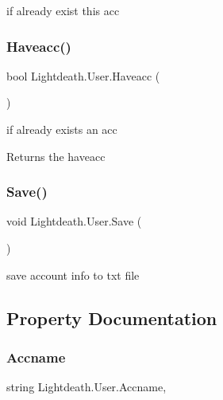 if already exist this acc 

\hypertarget{class_lightdeath_1_1_user_a1352aa65bececdd6929a5756ef2201a5}{}\label{class_lightdeath_1_1_user_a1352aa65bececdd6929a5756ef2201a5} 
\subsubsection{\texorpdfstring{Haveacc()}{Haveacc()}}
{\footnotesize\ttfamily bool Lightdeath.\+User.\+Haveacc (\begin{DoxyParamCaption}{ }\end{DoxyParamCaption})\hspace{0.3cm}{\ttfamily [inline]}}



if already exists an acc 

\begin{DoxyReturn}{Returns}
the haveacc
\end{DoxyReturn}
\hypertarget{class_lightdeath_1_1_user_a2bd89104f7fb1580a09f4a12defc1dea}{}\label{class_lightdeath_1_1_user_a2bd89104f7fb1580a09f4a12defc1dea} 
\subsubsection{\texorpdfstring{Save()}{Save()}}
{\footnotesize\ttfamily void Lightdeath.\+User.\+Save (\begin{DoxyParamCaption}{ }\end{DoxyParamCaption})\hspace{0.3cm}{\ttfamily [inline]}}



save account info to txt file 



\subsection{Property Documentation}
\hypertarget{class_lightdeath_1_1_user_a764e13d8c7bcb74e3373aaddfcc3578d}{}\label{class_lightdeath_1_1_user_a764e13d8c7bcb74e3373aaddfcc3578d} 
\subsubsection{\texorpdfstring{Accname}{Accname}}
{\footnotesize\ttfamily string Lightdeath.\+User.\+Accname\hspace{0.3cm}{\ttfamily [get]}, {\ttfamily [set]}}



